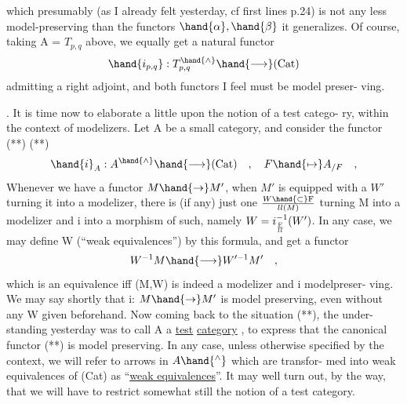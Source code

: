 which presumably (as I already felt yesterday, cf first lines p.24) is not
any less model-preserving than the functors $\hand{\alpha},\hand{\beta}$ it generalizes.  Of course,
taking A = $T_{p,q}$ above,  we equally get a natural functor
\[ \hand{i_{p,q}} : T^{\hand{\wedge}}_{p,q} \hand{\longrightarrow} (\mathrm{Cat}) \]
 admitting a right adjoint, and both functors I feel must be model preser-%
ving.

.  It is time now to elaborate a little upon the notion of a test catego-%
ry,  within the context of modelizers.  Let A be a small category,  and
consider  the functor (**)
 (**) \[ \hand{i}_{A} : A^{\hand{\wedge}} \hand{\longrightarrow} (\mathrm{Cat}) \quad , \quad F \hand{\mapsto} A_{/F} \quad , \]
Whenever we have a functor  $M \hand{\to} M'$,  when $M'$ is equipped with a $W'$ turning
it into a modelizer,  there is (if any)  just one $W \hand{\subset} \mathrm{F}\over{l}{l}(M)$ turning M into
a modelizer and i into a morphism of such,  namely $W = i_{\mathrm{F}\over{l}{l}}^{-1}(W')$.  In any
case,  we may define W (``weak equivalences'') by this formula,  and get a
functor
\[ W^{-1}M \hand{\longrightarrow} W'^{-1}M' \quad , \]
which is an equivalence iff (M,W) is indeed a modelizer and i modelpreser-%
ving.  We may say shortly that i: $M \hand{\to} M'$ is model preserving,  even without
any W given beforehand.  Now coming back to the situation  (**),  the under-%
standing yesterday was to call A a \uline{test} \uline{category} ,  to express that the
canonical functor (**) is model preserving. \hand{(}In any case,  unless otherwise
specified by the context, we will refer to arrows in $A\hand{^{\wedge}}$ which are transfor-%
med into weak equivalences of (Cat)  as ``\uline{weak equivalences}''.\hand{)} It may well
turn out,  by the way,  that we will have to restrict somewhat still the
notion of a test category.

